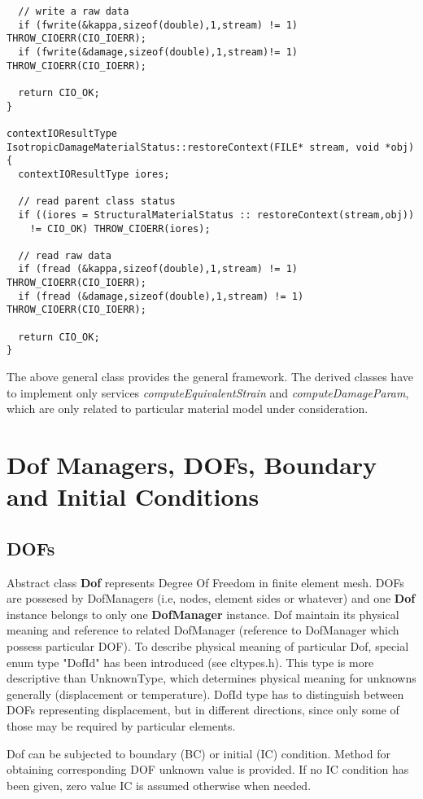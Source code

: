 \documentclass[12pt,draft]{article}
\newcommand{\class}[1]{{\bf #1}}
\newcommand{\service}[1]{{\em #1}}
\begin{document}
{\begin{verbatim}
  // write a raw data
  if (fwrite(&kappa,sizeof(double),1,stream) != 1) THROW_CIOERR(CIO_IOERR);
  if (fwrite(&damage,sizeof(double),1,stream)!= 1) THROW_CIOERR(CIO_IOERR);

  return CIO_OK;
}

contextIOResultType
IsotropicDamageMaterialStatus::restoreContext(FILE* stream, void *obj)
{
  contextIOResultType iores;

  // read parent class status
  if ((iores = StructuralMaterialStatus :: restoreContext(stream,obj)) 
    != CIO_OK) THROW_CIOERR(iores);

  // read raw data 
  if (fread (&kappa,sizeof(double),1,stream) != 1) THROW_CIOERR(CIO_IOERR);
  if (fread (&damage,sizeof(double),1,stream) != 1) THROW_CIOERR(CIO_IOERR);

  return CIO_OK;
}

\end{verbatim}}

The above general class provides the general framework. The derived
classes have to implement only services
\service{computeEquivalentStrain} and \service{computeDamageParam},
which are only related to particular material model under consideration.

\section{Dof Managers, DOFs, Boundary and Initial Conditions}
\subsection{DOFs}
Abstract class \class{Dof} represents Degree Of Freedom in finite element mesh. 
DOFs are possesed by DofManagers (i.e, nodes, element sides or whatever) and 
one \class{Dof} instance  belongs to only one \class{DofManager} instance.
Dof maintain its physical meaning and reference to
related DofManager (reference to DofManager which possess particular DOF).
To describe physical meaning of particular Dof, special enum type "DofId" has
been introduced (see cltypes.h). This type is more descriptive than 
UnknownType, which determines physical meaning for unknowns generally 
(displacement or temperature). DofId type has to distinguish between 
DOFs representing displacement, but in different directions, since
only some of those may be required by particular elements.

Dof can be subjected to boundary (BC) or initial (IC) condition. Method for 
obtaining corresponding DOF unknown value is provided. If no IC condition 
has been given, zero value IC is assumed otherwise when needed.
\end{document}
